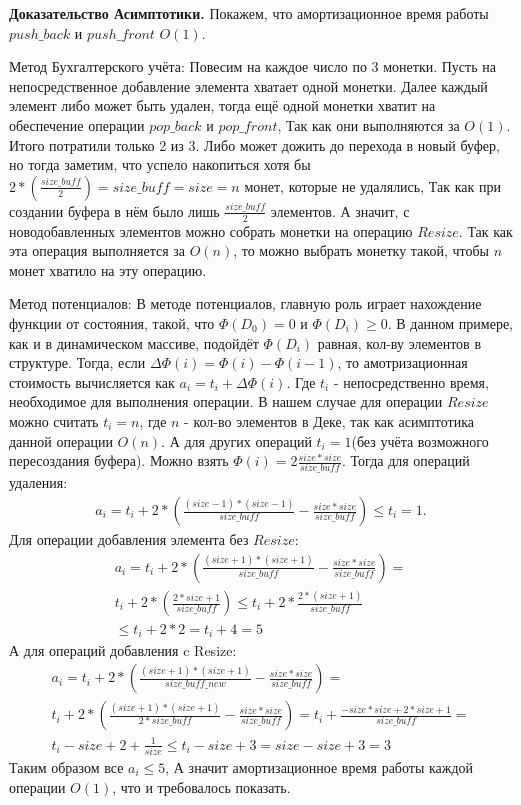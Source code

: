 \documentclass[12pt]{article}
\begin{document}
\textbf{Доказательство Асимптотики.} Покажем, что амортизационное время работы $push\_back$ и $push\_front$ $O(1)$.

Метод Бухгалтерского учёта: Повесим на каждое число по 3 монетки. Пусть на непосредственное добавление элемента хватает одной монетки.
Далее каждый элемент либо может быть удален, тогда ещё одной монетки хватит на обеспечение операции $pop\_back$ и $pop\_front$,
Так как они выполняются за $O(1)$.
Итого потратили только 2 из 3. 
Либо может дожить до перехода в новый буфер, но тогда заметим, что успело накопиться хотя бы $2 * (\frac{size\_buff}{2}) = size\_buff = size = n$ монет, которые не удалялись,
Так как при создании буфера в нём было лишь $\frac{size\_buff}{2}$ элементов. 
А значит, с новодобавленных элементов можно собрать монетки на операцию $Resize$. 
Так как эта операция выполняется за $O(n)$, то можно выбрать монетку такой, чтобы $n$ монет хватило на эту операцию.

Метод потенциалов: В методе потенциалов, главную роль играет нахождение функции от состояния, такой, что $\Phi(D_0) = 0$ и $\Phi(D_i) \geqslant 0$.
В данном примере, как и в динамическом массиве, подойдёт $\Phi(D_i)$ равная, кол-ву элементов в структуре. 
Тогда, если $\Delta\Phi(i) = \Phi(i) - \Phi(i - 1)$, то амотризационная стоимость вычисляется как $a_i = t_i + \Delta\Phi(i)$.
 Где $t_i$ - непосредственно время, необходимое для выполнения операции. 
 В нашем случае для операции $Resize$ можно считать $t_i = n$, где $n$ - кол-во элементов в Деке, так как асимптотика данной операции $O(n)$.
 А для других операций $t_i = 1$(без учёта возможного пересоздания буфера).
 Можно взять $\Phi(i) = 2 \frac{size * size}{size\_buff}$. 
 Тогда для операций удаления:
\begin{align*}
  	a_i = t_i + 2 * \left(\frac{(size - 1) * (size - 1)}{size\_buff} - \frac{size * size}{size\_buff}\right) \leqslant t_i = 1.
\end{align*}
Для операции добавления элемента без $Resize:$
 \begin{align*}
	a_i = t _i + 2 * \left(\frac{(size + 1) * (size + 1)}{size\_buff} - \frac{size * size}{size\_buff}\right) = \\
	t_i + 2 * \left(\frac{2 * size + 1}{size\_buff}\right) \leqslant t_i + 2 * \frac{2 * (size +1)}{size\_buff} \\
	\leqslant t_i + 2 * 2 = t_i + 4 = 5
\end{align*}
А для операций добавления c Resize: 
 \begin{align*}
	a_i = t _i + 2 * \left(\frac{(size + 1) * (size + 1)}{size\_buff\_new} - \frac{size * size}{size\_buff}\right) = \\
	t_i + 2 * \left(\frac{(size + 1) * (size + 1)}{2 * size\_buff} - \frac{size * size}{size\_buff}\right) = 
	t_i + \frac{-size * size + 2 * size + 1}{size\_buff} = \\
	t_i - size + 2 + \frac{1}{size} \leqslant t_i - size + 3 = size - size + 3 = 3	
\end{align*}
Таким образом все $a_i \leqslant 5$, А значит амортизационное время работы каждой операции $O(1)$, что и требовалось показать.
\end{document}
